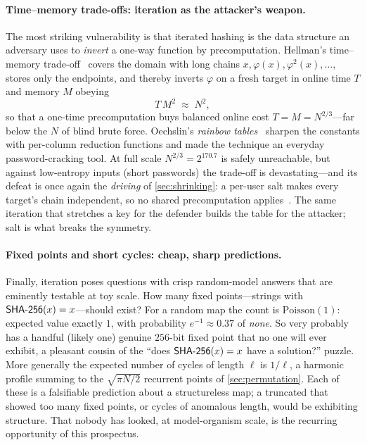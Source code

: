 \paragraph{Time--memory trade-offs: iteration as the attacker's
weapon.} The most striking vulnerability is that iterated hashing is the
data structure an adversary uses to \emph{invert} a one-way function by
precomputation. Hellman's time--memory trade-off~\citep{Hellman1980}
covers the domain with long chains $x, \varphi(x), \varphi^{2}(x),
\dots$, stores only the endpoints, and thereby inverts $\varphi$ on a
fresh target in online time $T$ and memory $M$ obeying
\[
  T\,M^{2} \;\approx\; N^{2},
\]
so that a one-time precomputation buys balanced online cost
$T = M = N^{2/3}$---far below the $N$ of blind brute force. Oechslin's
\emph{rainbow tables}~\citep{Oechslin2003} sharpen the constants with
per-column reduction functions and made the technique an everyday
password-cracking tool. At full \SHA{} scale $N^{2/3}=2^{170.7}$ is
safely unreachable, but against low-entropy inputs (short passwords) the
trade-off is devastating---and its defeat is once again the
\emph{driving} of \cref{sec:shrinking}: a per-user salt makes every
target's chain independent, so no shared precomputation
applies~\citep{NIST_SP800132}. The same iteration that stretches a key
for the defender builds the table for the attacker; salt is what breaks
the symmetry.

\paragraph{Fixed points and short cycles: cheap, sharp predictions.}
Finally, iteration poses questions with crisp random-model answers that
are eminently testable at toy scale. How many fixed points---strings
with $\textsf{SHA-256}(x)=x$---should exist? For a random map the count is
$\mathrm{Poisson}(1)$: expected value exactly $1$, with probability
$e^{-1}\approx 0.37$ of \emph{none}. So \SHA{} very probably has a
handful (likely one) genuine $256$-bit fixed point that no one will ever
exhibit, a pleasant cousin of the ``does $\textsf{SHA-256}(x)=x$ have a solution?''
puzzle. More generally the expected number of cycles of length $\ell$ is
$1/\ell$, a harmonic profile summing to the $\sqrt{\pi N/2}$ recurrent
points of \cref{sec:permutation}. Each of these is a falsifiable
prediction about a structureless map; a truncated \SHA{} that showed too
many fixed points, or cycles of anomalous length, would be exhibiting
structure. That nobody has looked, at model-organism scale, is the
recurring opportunity of this prospectus.

